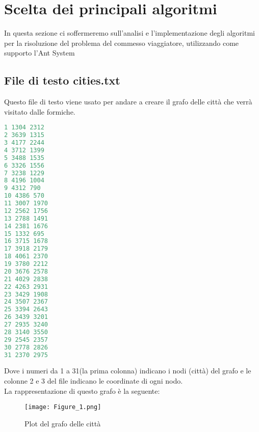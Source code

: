 \documentclass[a4paper,12pt]{report}
\begin{document}
\section{Scelta dei principali algoritmi}
In questa sezione ci soffermeremo sull'analisi e l'implementazione degli algoritmi per la risoluzione del problema del commesso viaggiatore, utilizzando come supporto l'Ant System
\subsection{File di testo cities.txt}
Questo file di testo viene usato per andare a creare il grafo delle città che verrà visitato dalle formiche.
\begin{lstlisting}[language=Python]
1 1304 2312
2 3639 1315
3 4177 2244
4 3712 1399
5 3488 1535
6 3326 1556
7 3238 1229
8 4196 1004
9 4312 790
10 4386 570
11 3007 1970
12 2562 1756
13 2788 1491
14 2381 1676
15 1332 695
16 3715 1678
17 3918 2179
18 4061 2370
19 3780 2212
20 3676 2578
21 4029 2838
22 4263 2931
23 3429 1908
24 3507 2367
25 3394 2643
26 3439 3201
27 2935 3240
28 3140 3550
29 2545 2357
30 2778 2826
31 2370 2975	
\end{lstlisting}
Dove i numeri da 1 a 31(la prima colonna) indicano i nodi (città) del grafo e le colonne 2 e 3 del file indicano le coordinate di ogni nodo.\\
La rappresentazione di questo grafo è la seguente:
\begin{figure}[H]
    \centering
    \texttt{[image: Figure\_1.png]}
    \caption{Plot del grafo delle città}
    \label{fig:my_label}

\end{figure}
\end{document}
